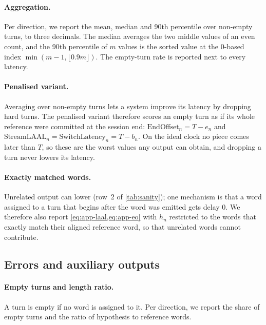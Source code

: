 \paragraph{Aggregation.}
Per direction, we report the mean, median and 90th percentile over non-empty turns, to three decimals. The median averages the two middle values of an even count, and the 90th percentile of $m$ values is the sorted value at the 0-based index $\min(m-1,\lfloor 0.9m\rfloor)$. The empty-turn rate is reported next to every latency.

\paragraph{Penalised variant.}
Averaging over non-empty turns lets a system improve its latency by dropping hard turns. The penalised variant therefore scores an empty turn as if its whole reference were committed at the session end: $\mathrm{EndOffset}_n=T-e_n$ and $\mathrm{StreamLAAL}_n=\mathrm{SwitchLatency}_n=T-b_n$. On the ideal clock no piece comes later than $T$, so these are the worst values any output can obtain, and dropping a turn never lowers its latency.

\paragraph{Exactly matched words.}
Unrelated output can lower \laal (row~2 of \cref{tab:sanity}); one mechanism is that a word assigned to a turn that begins after the word was emitted gets delay 0. We therefore also report \cref{eq:app-laal,eq:app-eo} with $h_n$ restricted to the words that exactly match their aligned reference word, so that unrelated words cannot contribute.

\subsection{Errors and auxiliary outputs}

\paragraph{Empty turns and length ratio.}
A turn is empty if no word is assigned to it. Per direction, we report the share of empty turns and the ratio of hypothesis to reference words.

